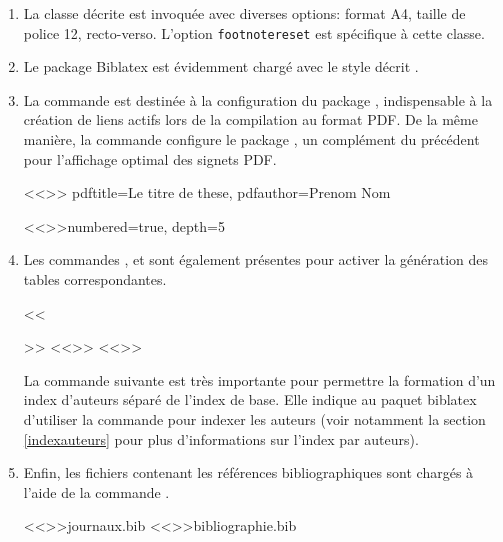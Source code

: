 \documentclass{ltxdockit}
\newcommand*{\biblatex}{Biblatex\xspace}
\newcommand*{\classname}{droit-fr\xspace}
\begin{document}
\begin{enumerate}

\item La classe \sty{\classname} décrite  est invoquée avec diverses options: format A4, taille de police 12, recto-verso. L'option \texttt{footnotereset} est spécifique à cette classe.

\item Le package \biblatex est évidemment chargé avec le style \sty{\classname} décrit .
\begin{ltxexample}
\usepackage[%
  style=<<droit-fr>>, %
  backend=<<biber>> %
  indexing=<<cite>> %
]{biblatex}
\end{ltxexample}

\item La commande  est destinée à la configuration du package , indispensable à la création de liens actifs lors de la compilation au format PDF. De la même manière, la commande  configure le package , un complément du précédent pour l'affichage optimal des signets PDF.
\begin{ltxexample}
<<\hypersetup>>{%
  pdftitle={Le titre de these},
  pdfauthor={Prenom Nom}
}

<<\bookmarksetup>>{numbered=true, depth=5}
\end{ltxexample}

\item Les commandes ,  et  sont également présentes pour activer la génération des tables correspondantes.
\begin{ltxexample}
<<\makeglossary>> %
<<\makeindexv>> %
<<\makeindexa>> %
\end{ltxexample}

La commande suivante est très importante pour permettre la formation d'un index d'auteurs séparé de l'index de base. Elle indique au paquet biblatex d'utiliser la commande  pour indexer les auteurs (voir notamment la section \ref{indexauteurs} pour plus d'informations sur l'index par auteurs).
\begin{ltxexample}
\end{ltxexample}

\item Enfin, les fichiers contenant les références bibliographiques sont chargés à l'aide de la commande .
\begin{ltxexample}
<<>>{journaux.bib}
<<>>{bibliographie.bib}
\end{ltxexample}

\end{enumerate}
\end{document}
